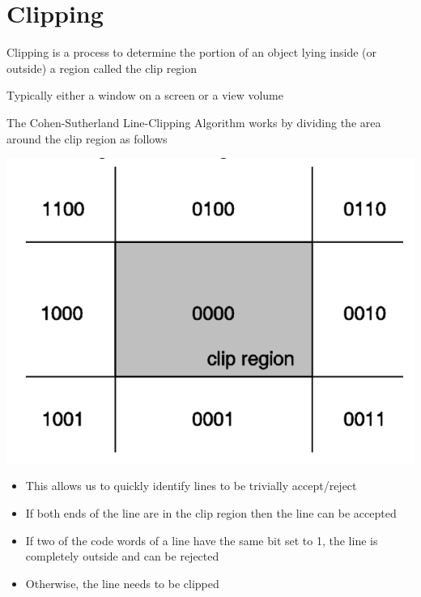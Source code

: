 \documentclass{article}[18pt]
\begin{document}
\section{Clipping}
Clipping is a process to determine the portion of an object lying inside (or outside) a region called the clip region
\begin{definition}
Typically either a window on a screen or a view volume
\end{definition}
The Cohen-Sutherland Line-Clipping Algorithm works by dividing the area around the clip region as follows
\begin{center}
	\includegraphics[scale=0.7]{Clipping}
\end{center}
\begin{itemize}
	\item This allows us to quickly identify lines to be trivially accept/reject
	\item If both ends of the line are in the clip region then the line can be accepted
	\item If two of the code words of a line have the same bit set to 1, the line is completely outside and can be rejected
	\item Otherwise, the line needs to be clipped
\end{itemize}
\end{document}
